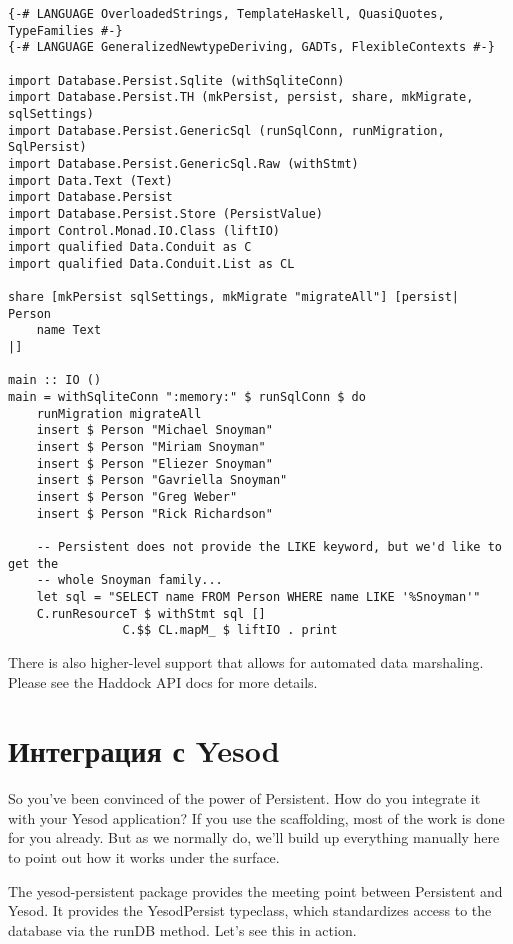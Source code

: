 \begin{lstlisting}
{-# LANGUAGE OverloadedStrings, TemplateHaskell, QuasiQuotes, TypeFamilies #-}
{-# LANGUAGE GeneralizedNewtypeDeriving, GADTs, FlexibleContexts #-}

import Database.Persist.Sqlite (withSqliteConn)
import Database.Persist.TH (mkPersist, persist, share, mkMigrate, sqlSettings)
import Database.Persist.GenericSql (runSqlConn, runMigration, SqlPersist)
import Database.Persist.GenericSql.Raw (withStmt)
import Data.Text (Text)
import Database.Persist
import Database.Persist.Store (PersistValue)
import Control.Monad.IO.Class (liftIO)
import qualified Data.Conduit as C
import qualified Data.Conduit.List as CL

share [mkPersist sqlSettings, mkMigrate "migrateAll"] [persist|
Person
    name Text
|]

main :: IO ()
main = withSqliteConn ":memory:" $ runSqlConn $ do
    runMigration migrateAll
    insert $ Person "Michael Snoyman"
    insert $ Person "Miriam Snoyman"
    insert $ Person "Eliezer Snoyman"
    insert $ Person "Gavriella Snoyman"
    insert $ Person "Greg Weber"
    insert $ Person "Rick Richardson"

    -- Persistent does not provide the LIKE keyword, but we'd like to get the
    -- whole Snoyman family...
    let sql = "SELECT name FROM Person WHERE name LIKE '%Snoyman'"
    C.runResourceT $ withStmt sql []
                C.$$ CL.mapM_ $ liftIO . print
\end{lstlisting}%

There is also higher-level support that allows for automated data marshaling. Please see the Haddock API docs for more details.

\section{Интеграция с Yesod} %

So you've been convinced of the power of Persistent. How do you integrate it with your Yesod application? If you use the scaffolding, most of the work is done for you already. But as we normally do, we'll build up everything manually here to point out how it works under the surface.

The yesod-persistent package provides the meeting point between Persistent and Yesod. It provides the YesodPersist typeclass, which standardizes access to the database via the runDB method. Let's see this in action.

